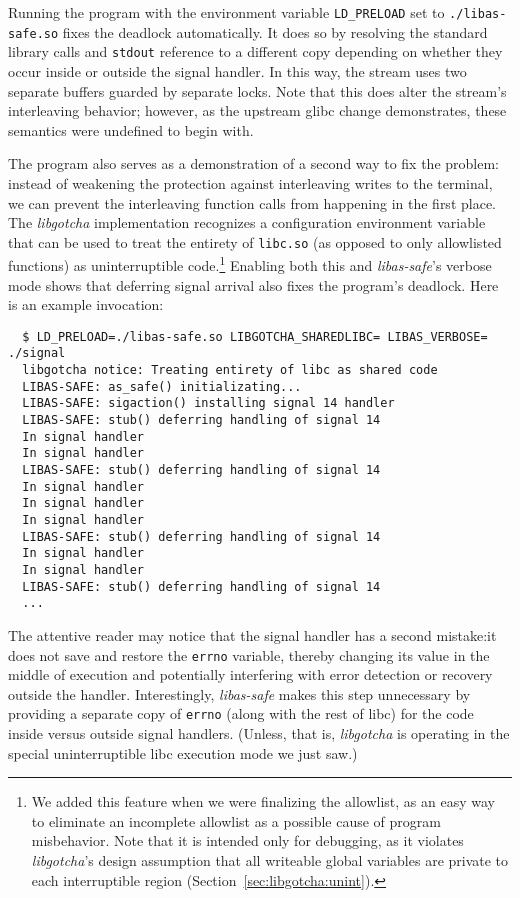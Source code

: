 Running the program with the environment variable \texttt{LD\_PRELOAD} set to
\texttt{./libas-safe.so} fixes the deadlock automatically.  It does so by resolving
the standard library calls and \texttt{stdout} reference to a different copy
depending on whether they occur inside or outside the signal handler.  In this way,
the stream uses two separate buffers guarded by separate locks.  Note that this does
alter the stream's interleaving behavior; however, as the upstream glibc change
demonstrates, these semantics were undefined to begin with.

The program also serves as a demonstration of a second way to fix the problem:\@
instead of weakening the protection against interleaving writes to the terminal, we
can prevent the interleaving function calls from happening in the first place.  The
\textit{libgotcha} implementation recognizes a configuration environment variable
that can be used to treat the entirety of \texttt{libc.so} (as opposed to only
allowlisted functions) as uninterruptible code.\footnote{We added this feature when
we were finalizing the allowlist, as an easy way to eliminate an incomplete allowlist
as a possible cause of program misbehavior.  Note that it is intended only for
debugging, as it violates \textit{libgotcha}'s design assumption that all writeable
global variables are private to each interruptible region
(Section~\ref{sec:libgotcha:unint}).}  Enabling both this and
\textit{libas-safe}'s verbose mode shows that deferring signal arrival also fixes the
program's deadlock.  Here is an example invocation:
\begin{lstlisting}
  $ LD_PRELOAD=./libas-safe.so LIBGOTCHA_SHAREDLIBC= LIBAS_VERBOSE= ./signal
  libgotcha notice: Treating entirety of libc as shared code
  LIBAS-SAFE: as_safe() initializating...
  LIBAS-SAFE: sigaction() installing signal 14 handler
  LIBAS-SAFE: stub() deferring handling of signal 14
  In signal handler
  In signal handler
  LIBAS-SAFE: stub() deferring handling of signal 14
  In signal handler
  In signal handler
  In signal handler
  LIBAS-SAFE: stub() deferring handling of signal 14
  In signal handler
  In signal handler
  LIBAS-SAFE: stub() deferring handling of signal 14
  ...
\end{lstlisting}

The attentive reader may notice that the signal handler has a second mistake:\@ it
does not save and restore the \texttt{errno} variable, thereby changing its value in
the middle of execution and potentially interfering with error detection or recovery
outside the handler.  Interestingly, \textit{libas-safe} makes this step unnecessary
by providing a separate copy of \texttt{errno} (along with the rest of libc) for the
code inside versus outside signal handlers.  (Unless, that is, \textit{libgotcha} is
operating in the special uninterruptible libc execution mode we just saw.)

